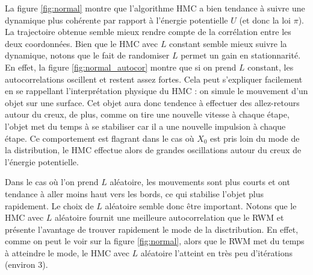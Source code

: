 \documentclass[10pt,a4paper]{article}
\begin{document}
La figure \ref{fig:normal} montre que l'algorithme HMC a bien tendance à suivre une dynamique plus cohérente par rapport à l'énergie potentielle $U$ (et donc la loi $\pi$). La trajectoire obtenue semble mieux rendre compte de la corrélation entre les deux coordonnées. Bien que le HMC avec $L$ constant semble mieux suivre la dynamique, notons que le fait de randomiser $L$ permet un gain en stationnarité. En effet, la figure \ref{fig:normal_autocor} montre que si on prend $L$ constant, les autocorrelations oscillent et restent assez fortes. Cela peut s'expliquer facilement en se rappellant l'interprétation physique du HMC : on simule le mouvement d'un objet sur une surface. Cet objet aura donc tendence à effectuer des allez-retours autour du creux, de plus, comme on tire une nouvelle vitesse à chaque étape, l'objet met du temps à se stabiliser car il a une nouvelle impulsion à chaque étape. Ce comportement est flagrant dans le cas où $X_0$ est pris loin du mode de la distribution, le HMC effectue alors de grandes oscillations autour du creux de l'énergie potentielle. 

Dans le cas où l'on prend $L$ aléatoire, les mouvements sont plus courts et ont tendance à aller moins haut vers les bords, ce qui stabilise l'objet plus rapidement. Le choix de $L$ aléatoire semble donc être important. Notons que le HMC avec $L$ aléatoire fournit une meilleure autocorrelation que le RWM et présente l'avantage de trouver rapidement le mode de la disctribution. En effet, comme on peut le voir sur la figure \ref{fig:normal}, alors que le RWM met du temps à atteindre le mode, le HMC avec $L$ aléatoire l'atteint en très peu d'itérations (environ 3). 
\end{document}
